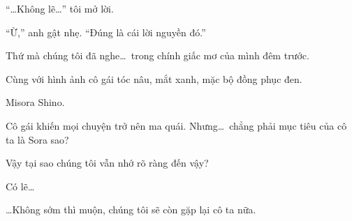 \documentclass[../main.tex]{subfiles}
\begin{document}
``\dots Không lẽ\dots'' tôi mở lời.

``Ừ,'' anh gật nhẹ. ``Đúng là cái lời nguyền đó.''

Thứ mà chúng tôi đã nghe\dots\ trong chính giấc mơ của mình đêm trước.

Cùng với hình ảnh cô gái tóc nâu, mắt xanh, mặc bộ đồng phục đen.

Misora Shino.


Cô gái khiến mọi chuyện trở nên ma quái. Nhưng\dots\ chẳng phải mục tiêu của cô ta là Sora sao?

Vậy tại sao chúng tôi vẫn nhớ rõ ràng đến vậy?

Có lẽ\dots

\dots Không sớm thì muộn, chúng tôi sẽ còn gặp lại cô ta nữa.
\end{document}
